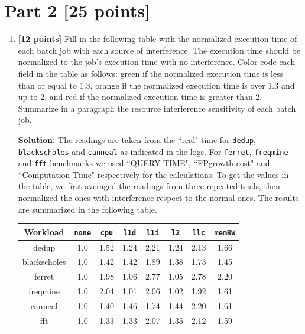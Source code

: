 \documentclass[11pt]{article}
\begin{document}
\section*{Part 2 [25 points]}
\begin{enumerate}
    \item \textbf{[12 points]} Fill in the following table with the normalized execution time of each batch job with each source of
    interference. The execution time should be normalized to the job’s execution time with no interference. Color-code each field in the
    table as follows: {\color{Green}green} if the normalized execution time is less than or equal to 1.3, {\color{YellowOrange}orange} if the normalized execution time is over 1.3
    and up to 2, and {\color{Red}red} if the normalized execution time is greater than 2. Summarize in a paragraph the resource interference sensitivity of
    each batch job.
    
    \textbf{Solution:} The readings are taken from the ``real" time for \texttt{dedup}, \texttt{blackscholes} and \texttt{canneal} as indicated in the logs. For \texttt{ferret}, \texttt{freqmine} and \texttt{fft} benchmarks we used ``QUERY TIME", ``FPgrowth cost" and ``Computation Time" respectively for the calculations. To get the values in the table, we first averaged the readings from three repeated trials, then normalized the ones with interference respect to the normal ones. The results are summarized in the following table.
    
\begin{center}
\begin{tabular}{ |c|c|c|c|c|c|c|c| } 
\hline
 \textbf{Workload} & \texttt{\textbf{none}} & \texttt{\textbf{cpu}} & \texttt{\textbf{l1d}} & \texttt{\textbf{l1i}} & \texttt{\textbf{l2}} & \texttt{\textbf{llc}} & \texttt{\textbf{memBW}}  \\
 \hline\hline
dedup         & 1.0 & \color{YellowOrange}1.52 & \color{Green}1.24 & \color{Red}2.21 & \color{Green}1.24 & \color{Red}2.13 & \color{YellowOrange}1.66 \\  \hline
blackscholes  & 1.0 & \color{YellowOrange}1.42 & \color{YellowOrange}1.42 & \color{YellowOrange}1.89 & \color{YellowOrange}1.38 & \color{YellowOrange}1.73 & \color{YellowOrange}1.45 \\  \hline
ferret        & 1.0 & \color{YellowOrange}1.98 & \color{Green}1.06 & \color{Red}2.77 & \color{Green}1.05 & \color{Red}2.78 & \color{Red}2.20 \\  \hline
freqmine      & 1.0 & \color{Red}2.04 & \color{Green}1.01 & \color{Red}2.06 & \color{Green}1.02 & \color{YellowOrange}1.92 & \color{YellowOrange}1.61 \\  \hline
canneal       & 1.0 & \color{YellowOrange}1.40 & \color{YellowOrange}1.46 & \color{YellowOrange}1.74 & \color{YellowOrange}1.44 & \color{Red}2.20 & \color{YellowOrange}1.61 \\  \hline
fft           & 1.0 & \color{YellowOrange}1.33 & \color{YellowOrange}1.33 & \color{Red}2.07 & \color{YellowOrange}1.35 & \color{Red}2.12 & \color{YellowOrange}1.59 \\  \hline
\end{tabular}
\end{center}
    

\end{enumerate}
\end{document}
